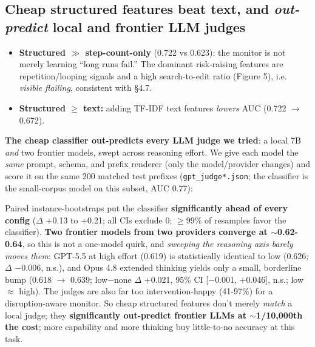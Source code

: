 \subsection{Cheap structured features beat text, and \emph{out-predict} local and frontier LLM judges}
\begin{itemize}
\item \textbf{Structured $\gg$ step-count-only} (0.722 vs 0.623): the monitor is not merely learning ``long runs fail.'' The dominant risk-raising features are repetition/looping signals and a high search-to-edit ratio (Figure 5), i.e. \emph{visible flailing}, consistent with \S4.7.
\item \textbf{Structured $\ge$ text:} adding TF-IDF text features \emph{lowers} AUC (0.722 $\to$ 0.672).
\end{itemize}
\textbf{The cheap classifier out-predicts every LLM judge we tried}: a local 7B \emph{and} two frontier models, swept across reasoning effort. We give each model the \emph{same} prompt, schema, and prefix renderer (only the model/provider changes) and score it on the same 200 matched test prefixes (\texttt{gpt\_judge*.json}; the classifier is the small-corpus model on this subset, AUC 0.77):

\begin{center}\small
{}
\end{center}
Paired instance-bootstraps put the classifier \textbf{significantly ahead of every config} ($\Delta$ +0.13 to +0.21; all CIs exclude 0; $\ge$99\% of resamples favor the classifier). \textbf{Two frontier models from two providers converge at $\sim$0.62-0.64}, so this is not a one-model quirk, and \emph{sweeping the reasoning axis barely moves them}: GPT-5.5 at high effort (0.619) is statistically identical to low (0.626; $\Delta$ $-$0.006, n.s.), and Opus 4.8 extended thinking yields only a small, borderline bump (0.618 $\to$ 0.639; low$-$none $\Delta$ +0.021, 95\% CI [$-$0.001, +0.046], n.s.; low $\approx$ high). The judges are also far too intervention-happy (41-97\%) for a disruption-aware monitor. So cheap structured features don't merely \emph{match} a local judge; they \textbf{significantly out-predict frontier LLMs at $\sim$1/10,000th the cost}; more capability and more thinking buy little-to-no accuracy at this task.

